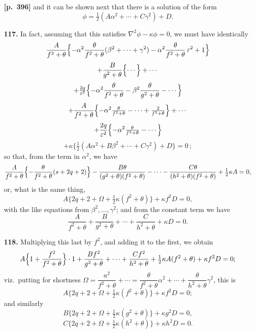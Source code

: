 \documentclass[11pt,a4paper]{article}
\begin{document}
\noindent\textbf{[p.~396]}\quad
and it can be shown next that there is a solution of the form
\[
\phi = \tfrac{1}{2}(A\alpha^{2} + \cdots + C\gamma^{2}) + D.
\]

\textbf{117.} In fact, assuming that this satisfies $\nabla^{2}\phi - \kappa\phi = 0$, we must have identically
\[
\frac{A}{f^{2}+\theta}\Bigl\{-\alpha^{2}\frac{\theta}{f^{2}+\theta}(\beta^{2} + \cdots + \gamma^{2}) - \alpha^{2}\frac{\theta}{f^{2}+\theta}\,\varepsilon^{2} + 1\Bigr\}
\]
\[
+ \frac{B}{g^{2}+\theta}\Bigl\{\cdots\Bigr\} + \cdots
\]
\[
+ \tfrac{2q}{\varepsilon^{2}}\Bigl\{-\alpha^{2}\frac{\theta}{f^{2}+\theta} - \beta^{2}\frac{\theta}{g^{2}+\theta} - \cdots\Bigr\}
\]
\[
+ \frac{A}{f^{2}+\theta}\Bigl\{-\alpha^{2}\tfrac{\theta}{f^{2}+\theta} - \cdots + \tfrac{2}{f^{2}+\theta}\Bigr\} + \cdots
\]
\[
+ \frac{2q}{\varepsilon^{2}}\Bigl\{-\alpha^{2}\tfrac{\theta}{f^{2}+\theta} - \cdots\Bigr\}
\]
\[
+ \kappa\bigl\{\tfrac{1}{2}(A\alpha^{2} + B\beta^{2} + \cdots + C\gamma^{2}) + D\bigr\} = 0\,;
\]
so that, from the term in $\alpha^{2}$, we have
\[
\frac{A}{f^{2}+\theta}\Bigl\{-\frac{\theta}{f^{2}+\theta}(s + 2q + 2)\Bigr\} - \frac{B\theta}{(g^{2}+\theta)(f^{2}+\theta)} - \cdots - \frac{C\theta}{(h^{2}+\theta)(f^{2}+\theta)} + \tfrac{1}{2}\kappa A = 0,
\]
or, what is the same thing,
\[
A\bigl\{2q + 2 + \Omega + \tfrac{1}{2}\kappa(f^{2} + \theta)\bigr\} + \kappa f^{2} D = 0,
\]
with the like equations from $\beta^{2}, \ldots, \gamma^{2}$; and from the constant term we have
\[
\frac{A}{f^{2}+\theta} + \frac{B}{g^{2}+\theta} + \cdots + \frac{C}{h^{2}+\theta} + \kappa D = 0.
\]

\textbf{118.} Multiplying this last by $f^{2}$, and adding it to the first, we obtain
\[
A\Bigl\{1 + \frac{f^{2}}{f^{2}+\theta}\Bigr\}\cdot 1 + \frac{B f^{2}}{g^{2}+\theta} + \cdots + \frac{C f^{2}}{h^{2}+\theta} + \tfrac{1}{2}\kappa A(f^{2}+\theta) + \kappa f^{2} D = 0;
\]
viz.\ putting for shortness $\Omega = \dfrac{a^{2}}{f^{2}+\theta} + \cdots = \dfrac{\theta}{f^{2}+\theta}\alpha^{2} + \cdots + \dfrac{\theta}{h^{2}+\theta}\gamma^{2}$, this is
\[
A\bigl\{2q + 2 + \Omega + \tfrac{1}{2}\kappa(f^{2}+\theta)\bigr\} + \kappa f^{2} D = 0;
\]
and similarly
\[
B\bigl\{2q + 2 + \Omega + \tfrac{1}{2}\kappa(g^{2}+\theta)\bigr\} + \kappa g^{2} D = 0,
\]
\[
C\bigl\{2q + 2 + \Omega + \tfrac{1}{2}\kappa(h^{2}+\theta)\bigr\} + \kappa h^{2} D = 0.
\]
\end{document}
